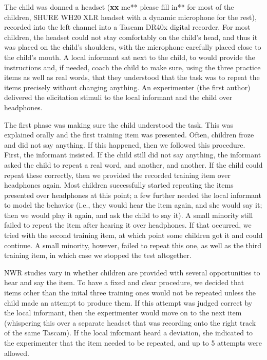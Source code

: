 \documentclass[english,,man,floatsintext]{apa6}
\begin{document}
The child was donned a headset (\textbf{xx }mc** please fill in** for
most of the children, SHURE WH20 XLR headset with a dynamic microphone
for the rest), recorded into the left channel into a Tascam DR40x
digital recorder. For most children, the headset could not stay
comfortably on the child's head, and thus it was placed on the child's
shoulders, with the microphone carefully placed close to the child's
mouth. A local informant sat next to the child, to would provide the
instructions and, if needed, coach the child to make sure, using the
three practice items as well as real words, that they understood that
the task was to repeat the items precisely without changing anything. An
experimenter (the first author) delivered the elicitation stimuli to the
local informant and the child over headphones.

The first phase was making sure the child understood the task. This was
explained orally and the first training item was presented. Often,
children froze and did not say anything. If this happened, then we
followed this procedure. First, the informant insisted. If the child
still did not say anything, the informant asked the child to repeat a
real word, and another, and another. If the child could repeat these
correctly, then we provided the recorded training item over headphones
again. Most children successfully started repeating the items presented
over headphones at this point; a few further needed the local informant
to model the behavior (i.e., they would hear the item again, and she
would say it; then we would play it again, and ask the child to say it).
A small minority still failed to repeat the item after hearing it over
headphones. If that occurred, we tried with the second training item, at
which point some children got it and could continue. A small minority,
however, failed to repeat this one, as well as the third training item,
in which case we stopped the test altogether.

NWR studies vary in whether children are provided with several
opportunities to hear and say the item. To have a fixed and clear
procedure, we decided that items other than the inital three training
ones would not be repeated unless the child made an attempt to produce
them. If this attempt was judged correct by the local informant, then
the experimenter would move on to the next item (whispering this over a
separate headset that was recording onto the right track of the same
Tascam). If the local informant heard a deviation, she indicated to the
experimenter that the item needed to be repeated, and up to 5 attempts
were allowed.
\end{document}

